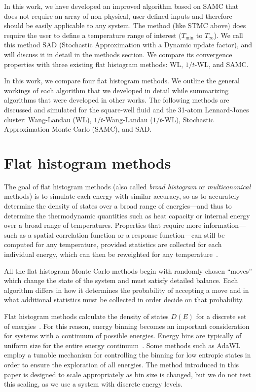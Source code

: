\documentclass[letterpaper,twocolumn,amsmath,amssymb,pre,aps,10pt]{revtex4-1}
\begin{document}
In this work, we have developed an improved algorithm based on SAMC that does
not require an array of non-physical, user-defined inputs and therefore should
be easily applicable to any system. The method (like STMC above) does require
the user to define a temperature range of interest ($T_\text{min}$ to
$T_\infty$).  We call this method SAD (Stochastic Approximation with a Dynamic
update factor), and will discuss it in detail in the methods section. We compare
its convergence properties with three existing flat histogram methods: WL,
$1/t$-WL, and SAMC.

In this work, we compare four flat histogram methods.  We outline the
general workings of each algorithm that we developed in detail while
summarizing algorithms that were developed in other works.  The
following methods are discussed and simulated for the square-well
fluid and the 31-atom Lennard-Jones cluster: Wang-Landau (WL),
$1/t$-Wang-Landau ($1/t$-WL), Stochastic Approximation Monte Carlo
(SAMC), and SAD.

\section{Flat histogram methods}\label{sec:histogram}
The goal of flat histogram methods (also called \emph{broad histogram}
or \emph{multicanonical} methods) is to simulate each energy with
similar accuracy, so as to accurately determine the density of states
over a broad range of energies---and thus to determine the thermodynamic
quantities such as heat capacity or internal energy
over a broad range of temperatures.
Properties that require more information---such as a spatial
correlation function or a response function---can still be computed
for any temperature, provided statistics are collected for each
individual energy, which can then be reweighted for any
temperature~\cite{panagiotopoulos1998phase, panagiotopoulos2000monte,
errington2003direct}.

All the flat histogram Monte Carlo methods begin with randomly chosen
``moves'' which change the state of the system and must satisfy
detailed balance.  Each algorithm differs in how it determines the
probability of accepting a move and in what additional statistics must
be collected in order decide on that probability.

Flat histogram methods calculate the density of states $D(E)$ for a discrete set
of energies~\cite{wang2001determining, dayal2004performance, troyer2003flat,
trebst2004optimizing}. For this reason, energy binning becomes an important
consideration for systems with a continuum of possible energies.  Energy bins
are typically of uniform size for the entire energy
continuum~\cite{fasnacht2004adaptive}. Some methods such as
AdaWL~\cite{koh2013dynamically} employ a tunable mechanism for controlling the
binning for low entropic states in order to ensure the exploration of all
energies.  The method introduced in this paper is designed to scale
appropriately as bin size is changed, but we do not test this scaling, as we use
a system with discrete energy levels.
\end{document}
